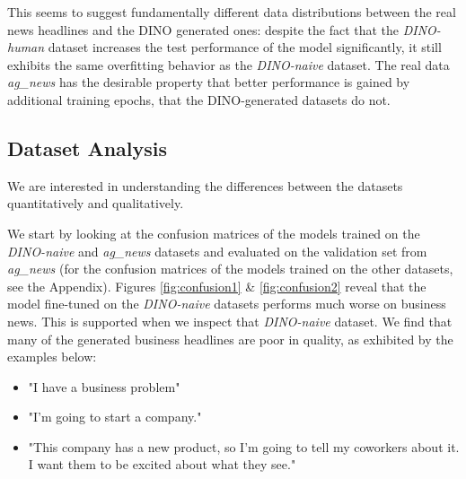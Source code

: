 \documentclass[11pt]{article}
\begin{document}
This seems to suggest fundamentally different data distributions between the real news headlines and the DINO generated ones: despite the fact that the \textit{DINO-human} dataset increases the test performance of the model significantly, it still exhibits the same overfitting behavior as the \textit{DINO-naive} dataset. The real data \textit{ag\_news} has the desirable property that better performance is gained by additional training epochs, that the DINO-generated datasets do not. 



\subsection{Dataset Analysis}

We are interested in understanding the differences between the datasets quantitatively and qualitatively.

We start by looking at the confusion matrices of the models trained on the \textit{DINO-naive} and \textit{ag\_news} datasets and evaluated on the validation set from \textit{ag\_news} (for the confusion matrices of the models trained on the other datasets, see the Appendix). Figures \ref{fig:confusion1} \& \ref{fig:confusion2} reveal that the model fine-tuned on the \textit{DINO-naive} datasets performs much worse on business news. This is supported when we inspect that \textit{DINO-naive} dataset. We find that many of the generated business headlines are poor in quality, as exhibited by the examples below:
\begin{itemize}
    \item "I have a business problem"
    \item "I'm going to start a company."
    \item "This company has a new product, so I'm going to tell my coworkers about it. I want them to be excited about what they see."
\end{itemize}
\end{document}
